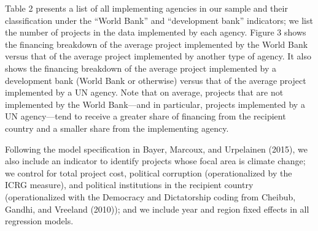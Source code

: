 \documentclass{article}
\begin{document}
 Table 2 presents a list of all implementing agencies in our sample and their classification under the “World Bank” and “development bank” indicators; we list the number of projects in the data implemented by each agency.  Figure 3 shows the financing breakdown of the average project implemented by the World Bank versus that of the average project implemented by another type of agency.  It also shows the financing breakdown of the average project implemented by a development bank (World Bank or otherwise) versus that of the average project implemented by a UN agency.  Note that on average, projects that are not implemented by the World Bank---and in particular, projects implemented by a UN agency---tend to receive a greater share of financing from the recipient country and a smaller share from the implementing agency. 
 
 Following the model specification in Bayer, Marcoux, and Urpelainen (2015), we also include an indicator to identify projects whose focal area is climate change; we control for total project cost, political corruption (operationalized by the ICRG measure), and political institutions in the recipient country (operationalized with the Democracy and Dictatorship coding from Cheibub, Gandhi, and Vreeland (2010)); and we include year and region fixed effects in all regression models.
\end{document}
